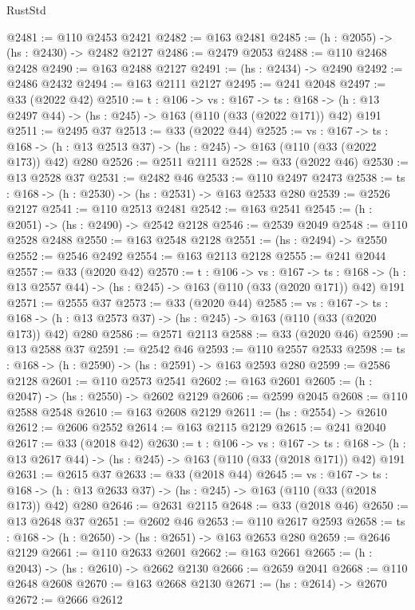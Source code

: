 \begin{lexlean}{RustStd}
\begin{coremodule}
@2481 := @110 @2453 @2421
@2482 := @163 @2481
@2485 := (h : @2055) -> (hs : @2430) -> @2482 @2127
@2486 := @2479 @2053
@2488 := @110 @2468 @2428
@2490 := @163 @2488 @2127
@2491 := (hs : @2434) -> @2490
@2492 := @2486 @2432
@2494 := @163 @2111 @2127
@2495 := @241 @2048
@2497 := @33 (@2022 @42)
@2510 := {t : @106} ->
  {vs : @167} ->
  {ts : @168} -> (h : @13 @2497 @44) -> (hs : @245) -> @163 (@110 (@33 (@2022 @171)) @42) @191
@2511 := @2495 @37
@2513 := @33 (@2022 @44)
@2525 := {vs : @167} ->
  {ts : @168} -> (h : @13 @2513 @37) -> (hs : @245) -> @163 (@110 (@33 (@2022 @173)) @42) @280
@2526 := @2511 @2111
@2528 := @33 (@2022 @46)
@2530 := @13 @2528 @37
@2531 := @2482 @46
@2533 := @110 @2497 @2473
@2538 := {ts : @168} -> (h : @2530) -> (hs : @2531) -> @163 @2533 @280
@2539 := @2526 @2127
@2541 := @110 @2513 @2481
@2542 := @163 @2541
@2545 := (h : @2051) -> (hs : @2490) -> @2542 @2128
@2546 := @2539 @2049
@2548 := @110 @2528 @2488
@2550 := @163 @2548 @2128
@2551 := (hs : @2494) -> @2550
@2552 := @2546 @2492
@2554 := @163 @2113 @2128
@2555 := @241 @2044
@2557 := @33 (@2020 @42)
@2570 := {t : @106} ->
  {vs : @167} ->
  {ts : @168} -> (h : @13 @2557 @44) -> (hs : @245) -> @163 (@110 (@33 (@2020 @171)) @42) @191
@2571 := @2555 @37
@2573 := @33 (@2020 @44)
@2585 := {vs : @167} ->
  {ts : @168} -> (h : @13 @2573 @37) -> (hs : @245) -> @163 (@110 (@33 (@2020 @173)) @42) @280
@2586 := @2571 @2113
@2588 := @33 (@2020 @46)
@2590 := @13 @2588 @37
@2591 := @2542 @46
@2593 := @110 @2557 @2533
@2598 := {ts : @168} -> (h : @2590) -> (hs : @2591) -> @163 @2593 @280
@2599 := @2586 @2128
@2601 := @110 @2573 @2541
@2602 := @163 @2601
@2605 := (h : @2047) -> (hs : @2550) -> @2602 @2129
@2606 := @2599 @2045
@2608 := @110 @2588 @2548
@2610 := @163 @2608 @2129
@2611 := (hs : @2554) -> @2610
@2612 := @2606 @2552
@2614 := @163 @2115 @2129
@2615 := @241 @2040
@2617 := @33 (@2018 @42)
@2630 := {t : @106} ->
  {vs : @167} ->
  {ts : @168} -> (h : @13 @2617 @44) -> (hs : @245) -> @163 (@110 (@33 (@2018 @171)) @42) @191
@2631 := @2615 @37
@2633 := @33 (@2018 @44)
@2645 := {vs : @167} ->
  {ts : @168} -> (h : @13 @2633 @37) -> (hs : @245) -> @163 (@110 (@33 (@2018 @173)) @42) @280
@2646 := @2631 @2115
@2648 := @33 (@2018 @46)
@2650 := @13 @2648 @37
@2651 := @2602 @46
@2653 := @110 @2617 @2593
@2658 := {ts : @168} -> (h : @2650) -> (hs : @2651) -> @163 @2653 @280
@2659 := @2646 @2129
@2661 := @110 @2633 @2601
@2662 := @163 @2661
@2665 := (h : @2043) -> (hs : @2610) -> @2662 @2130
@2666 := @2659 @2041
@2668 := @110 @2648 @2608
@2670 := @163 @2668 @2130
@2671 := (hs : @2614) -> @2670
@2672 := @2666 @2612

\end{coremodule}
\end{lexlean}
